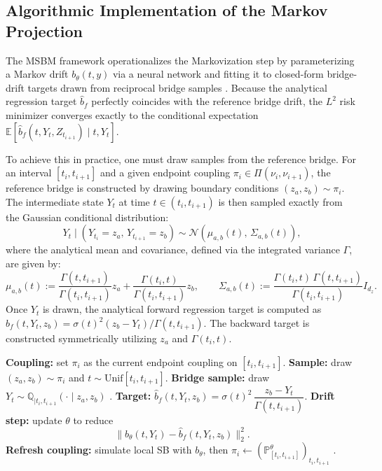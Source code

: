 \documentclass[review,onefignum,onetabnum]{siamart250211}
\newcommand{\E}{\mathbb{E}}
\newcommand{\1}{\mathbf{1}}
\begin{document}
\subsection{Algorithmic Implementation of the Markov Projection}
The \textsc{MSBM} framework operationalizes the Markovization step by parameterizing a Markov drift $b_\theta(t, y)$ via a neural network and fitting it to closed-form bridge-drift targets drawn from reciprocal bridge samples \cite{park2025msbm}. Because the analytical regression target $\widehat{b}_f$ perfectly coincides with the reference bridge drift, the $L^2$ risk minimizer converges exactly to the conditional expectation $\E[\widehat{b}_f(t, Y_t, Z_{t_{i+1}}) \mid t, Y_t]$.

To achieve this in practice, one must draw samples from the reference bridge. For an interval $[t_i, t_{i+1}]$ and a given endpoint coupling $\pi_i \in \Pi(\nu_i, \nu_{i+1})$, the reference bridge is constructed by drawing boundary conditions $(z_a, z_b) \sim \pi_i$. The intermediate state $Y_t$ at time $t \in (t_i, t_{i+1})$ is then sampled exactly from the Gaussian conditional distribution:
$$
Y_t \mid (Y_{t_i}=z_a,\,Y_{t_{i+1}}=z_b) \sim \mathcal{N}\left( \mu_{a,b}(t), \, \Sigma_{a,b}(t) \right),
$$
where the analytical mean and covariance, defined via the integrated variance $\Gamma$, are given by:
$$
\mu_{a,b}(t) := \frac{\Gamma(t,t_{i+1})}{\Gamma(t_i,t_{i+1})}z_a + \frac{\Gamma(t_i,t)}{\Gamma(t_i,t_{i+1})}z_b, \qquad \Sigma_{a,b}(t) := \frac{\Gamma(t_i,t)\,\Gamma(t,t_{i+1})}{\Gamma(t_i,t_{i+1})} I_{d_z}.
$$
Once $Y_t$ is drawn, the analytical forward regression target is computed as $\widehat{b}_f(t, Y_t, z_b) = \sigma(t)^2 (z_b - Y_t) / \Gamma(t, t_{i+1})$. The backward target is constructed symmetrically utilizing $z_a$ and $\Gamma(t_i, t)$.

\begin{algorithm}[H]
\caption{Markov drift update on $[t_i,t_{i+1}]$ (\textsc{MSBM})}
\label{alg:markovization_drift_regression}
\begin{algorithmic}[1]
\State \textbf{Coupling:} set $\pi_i$ as the current endpoint coupling on $[t_i,t_{i+1}]$.
\State \textbf{Sample:} draw $(z_a,z_b)\sim\pi_i$ and $t\sim\mathrm{Unif}[t_i,t_{i+1}]$.
\State \textbf{Bridge sample:} draw $Y_t \sim \mathbb{Q}_{\mid t_i,t_{i+1}}(\cdot\mid z_a,z_b)$ \cite{park2025msbm}.
\State \textbf{Target:} $\widehat b_f(t,Y_t,z_b)=\sigma(t)^2\,\dfrac{z_b-Y_t}{\Gamma(t,t_{i+1})}$.
\State \textbf{Drift step:} update $\theta$ to reduce
\[
\|b_\theta(t,Y_t)-\widehat b_f(t,Y_t,z_b)\|_2^2.
\]
\State \textbf{Refresh coupling:} simulate local SB with $b_\theta$, then
$\pi_i \gets (\mathbb{P}_{[t_i,t_{i+1}]}^\theta)_{t_i,t_{i+1}}$ \cite{park2025msbm}.
\end{algorithmic}
\end{algorithm}
\end{document}
